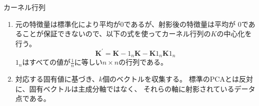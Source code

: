 \documentclass[aspectratio=169, dvipdfmx, 11pt]{beamer} %
\begin{document}
\begin{frame}{カーネル行列}
    \begin{enumerate}
        \item 元の特徴量は標準化により平均が0であるが、射影後の特徴量は平均が
        0であることが保証できないので、以下の式を使ってカーネル行列の\(K\)の中心化を行う。
        \begin{equation*}
            \bm{K}^{'} = \bm{K} - 1_n \bm{K} - \bm{K} 1_n \bm{K} 1_n
        \end{equation*}
        \(1_n\)はすべての値が\(\frac{1}{n}\)に等しい\(n \times n\)の行列である。
        \vspace{1em}
        \item 対応する固有値に基づき、\(k\)個のベクトルを収集する。
        標準のPCAとは反対に、固有ベクトルは主成分軸ではなく、
        それらの軸に射影されているデータ点である。
    \end{enumerate}

\end{frame}
\end{document}
